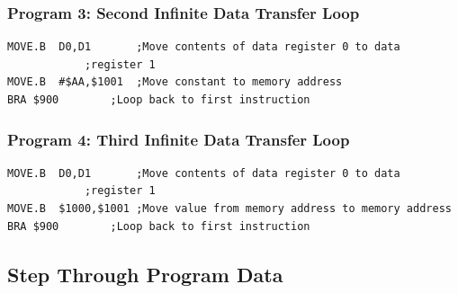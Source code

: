 \documentclass[12pt, twocolumn]{article}
\begin{document}
\subsubsection{Program 3: \normalfont Second Infinite Data Transfer Loop}
\label{prog3}
\begin{lstlisting}
MOVE.B	D0,D1		;Move contents of data register 0 to data 
			;register 1
MOVE.B	#$AA,$1001	;Move constant to memory address
BRA	$900		;Loop back to first instruction
\end{lstlisting}

\subsubsection{Program 4: \normalfont Third Infinite Data Transfer Loop}
\label{prog4}
\begin{lstlisting}
MOVE.B	D0,D1		;Move contents of data register 0 to data 
			;register 1
MOVE.B	$1000,$1001	;Move value from memory address to memory address
BRA	$900		;Loop back to first instruction
\end{lstlisting}

\subsection{Step Through Program Data}
\twocolumn
\end{document}
